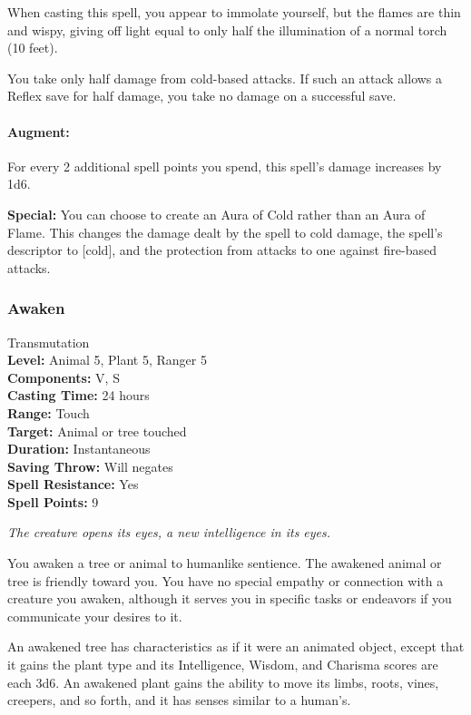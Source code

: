 When casting this spell, you appear to immolate yourself, but the flames are thin and wispy, 
giving off light equal to only half the illumination of a normal torch (10 feet). 

You take only half damage from cold-based attacks. 
If such an attack allows a Reflex save for half damage, you take no damage on a successful save.

\paragraph{Augment:} For every 2 additional spell points you spend, this spell's damage increases by 1d6.

\textbf{Special:} You can choose to create an Aura of Cold rather than an Aura of Flame. This changes the damage
dealt by the spell to cold damage, the spell's descriptor to [cold], and the protection from attacks to one
against fire-based attacks.
\subsubsection{Awaken}
\label{Spell:Awaken}
Transmutation
\\ \textbf{Level:} Animal 5, Plant 5, Ranger 5
\\ \textbf{Components:} V, S
\\ \textbf{Casting Time:} 24 hours
\\ \textbf{Range:} Touch
\\ \textbf{Target:} Animal or tree touched
\\ \textbf{Duration:} Instantaneous
\\ \textbf{Saving Throw:} Will negates
\\ \textbf{Spell Resistance:} Yes
\\ \textbf{Spell Points:} 9

\emph{The creature opens its eyes, a new intelligence in its eyes.}

You awaken a tree or animal to humanlike sentience. %
The awakened animal or tree is friendly toward you. You have no special empathy or connection with a creature you awaken, although it serves you in specific tasks or endeavors if you communicate your desires to it.

An awakened tree has characteristics as if it were an animated object, except that it gains the plant type and its Intelligence, Wisdom, and Charisma scores are each 3d6. 
An awakened plant gains the ability to move its limbs, roots, vines, creepers, and so forth, and it has senses similar to a human's.

